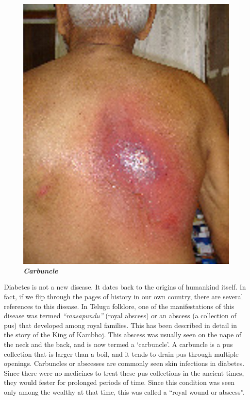 \begin{figure}
\centering
\includegraphics[scale=.9]{images/006.jpg}\\
\textbf{\textit{Carbuncle}}
\end{figure}

Diabetes is not a new disease. It dates back to the origins of humankind itself. In fact, if we flip through the pages of history in our own country, there are several refe\-rences to this disease. In Telugu folklore, one of the manifestations of this disease was termed \textit{“raasapundu”} (royal abscess) or an abscess (a collection of pus) that deve\-loped among royal families. This has been described in detail in the story of the King of Kambhoj. This abscess was usually seen on the nape of the neck and the back, and is now termed a ‘carbuncle’. A carbuncle is a pus collection that is larger than a boil, and it tends to drain pus through multiple openings. Carbuncles or abscesses are commonly seen skin infections in diabetes. Since there were no medicines to treat these pus collections in the ancient times, they would fester for prolonged periods of time. Since this condition was seen only among the wealthy at that time, this was called a “royal wound or abscess”.

